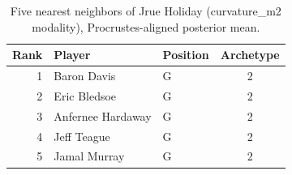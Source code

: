 \begin{table}[htbp]
  \centering\small
  \begin{tabular}{rllc}
    \toprule
    Rank & Player & Position & Archetype \\
    \midrule
    1 & Baron Davis & G & 2 \\
    2 & Eric Bledsoe & G & 2 \\
    3 & Anfernee Hardaway & G & 2 \\
    4 & Jeff Teague & G & 2 \\
    5 & Jamal Murray & G & 2 \\
    \bottomrule
  \end{tabular}
  \caption{Five nearest neighbors of Jrue Holiday (curvature_m2 modality), Procrustes-aligned posterior mean.}
  \label{tab:Jrue_Holiday_neighbors_curvature_m2}
\end{table}

